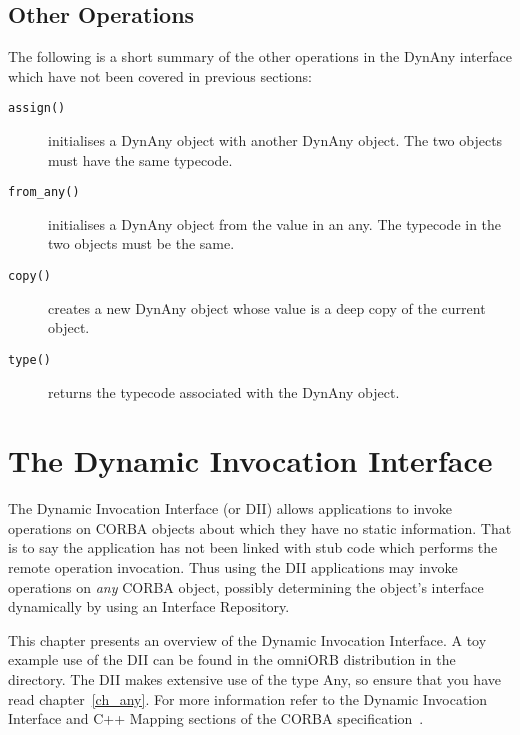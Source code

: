 \documentclass[11pt,twoside,a4paper]{book}
\newcommand{\op}[1]{\texttt{#1()}}
\newcommand{\file}{\begingroup \urlstyle{tt}\Url}
\begin{document}
\section{Other Operations}

The following is a short summary of the other operations in the DynAny
interface which have not been covered in previous sections:

\begin{description}
\item[\op{assign}] initialises a DynAny object with another DynAny
object. The two objects must have the same typecode.

\item[\op{from\_any}] initialises a DynAny object from the value in an
any. The typecode in the two objects must be the same.

\item[\op{copy}] creates a new DynAny object whose value is a deep
copy of the current object.

\item[\op{type}] returns the typecode associated with the DynAny
object.

\end{description}



\chapter{The Dynamic Invocation Interface}

The Dynamic Invocation Interface (or DII) allows applications to
invoke operations on CORBA objects about which they have no static
information. That is to say the application has not been linked with
stub code which performs the remote operation invocation. Thus using
the DII applications may invoke operations on \emph{any} CORBA object,
possibly determining the object's interface dynamically by using an
Interface Repository.

This chapter presents an overview of the Dynamic Invocation Interface.
A toy example use of the DII can be found in the omniORB distribution
in the \file{src/examples/dii} directory.  The DII makes extensive use
of the type Any, so ensure that you have read chapter~\ref{ch_any}.
For more information refer to the Dynamic Invocation Interface and C++
Mapping sections of the CORBA specification~\cite{corba23-spec}.
\end{document}
